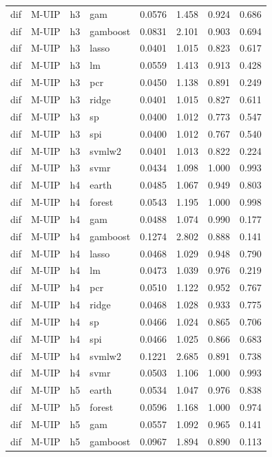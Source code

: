 \begin{ThreePartTable}
\begin{longtable}[t]{llclcccc}
dif & M-UIP & h3 & gam & 0.0576 & 1.458 & 0.924 & 0.686\\
dif & M-UIP & h3 & gamboost & 0.0831 & 2.101 & 0.903 & 0.694\\
dif & M-UIP & h3 & lasso & 0.0401 & 1.015 & 0.823 & 0.617\\
dif & M-UIP & h3 & lm & 0.0559 & 1.413 & 0.913 & 0.428\\
dif & M-UIP & h3 & pcr & 0.0450 & 1.138 & 0.891 & 0.249\\
dif & M-UIP & h3 & ridge & 0.0401 & 1.015 & 0.827 & 0.611\\
dif & M-UIP & h3 & sp & 0.0400 & 1.012 & 0.773 & 0.547\\
dif & M-UIP & h3 & spi & 0.0400 & 1.012 & 0.767 & 0.540\\
dif & M-UIP & h3 & svmlw2 & 0.0401 & 1.013 & 0.822 & 0.224\\
dif & M-UIP & h3 & svmr & 0.0434 & 1.098 & 1.000 & 0.993\\
\addlinespace
dif & M-UIP & h4 & earth & 0.0485 & 1.067 & 0.949 & 0.803\\
dif & M-UIP & h4 & forest & 0.0543 & 1.195 & 1.000 & 0.998\\
dif & M-UIP & h4 & gam & 0.0488 & 1.074 & 0.990 & 0.177\\
dif & M-UIP & h4 & gamboost & 0.1274 & 2.802 & 0.888 & 0.141\\
dif & M-UIP & h4 & lasso & 0.0468 & 1.029 & 0.948 & 0.790\\
dif & M-UIP & h4 & lm & 0.0473 & 1.039 & 0.976 & 0.219\\
dif & M-UIP & h4 & pcr & 0.0510 & 1.122 & 0.952 & 0.767\\
dif & M-UIP & h4 & ridge & 0.0468 & 1.028 & 0.933 & 0.775\\
dif & M-UIP & h4 & sp & 0.0466 & 1.024 & 0.865 & 0.706\\
dif & M-UIP & h4 & spi & 0.0466 & 1.025 & 0.866 & 0.683\\
dif & M-UIP & h4 & svmlw2 & 0.1221 & 2.685 & 0.891 & 0.738\\
dif & M-UIP & h4 & svmr & 0.0503 & 1.106 & 1.000 & 0.993\\
\addlinespace
dif & M-UIP & h5 & earth & 0.0534 & 1.047 & 0.976 & 0.838\\
dif & M-UIP & h5 & forest & 0.0596 & 1.168 & 1.000 & 0.974\\
dif & M-UIP & h5 & gam & 0.0557 & 1.092 & 0.965 & 0.141\\
dif & M-UIP & h5 & gamboost & 0.0967 & 1.894 & 0.890 & 0.113\\

\end{longtable}
\end{ThreePartTable}
